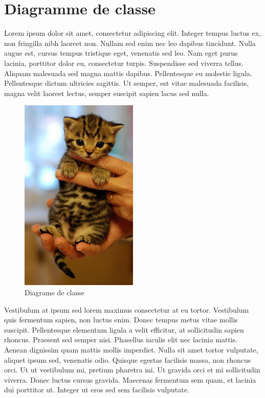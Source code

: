 \section{Diagramme de classe}

Lorem ipsum dolor sit amet, consectetur adipiscing elit. Integer tempus luctus ex, non fringilla nibh laoreet non. Nullam sed enim nec leo dapibus tincidunt. Nulla augue est, cursus tempus tristique eget, venenatis sed leo. Nam eget purus lacinia, porttitor dolor eu, consectetur turpis. Suspendisse sed viverra tellus. Aliquam malesuada sed magna mattis dapibus. Pellentesque eu molestie ligula. Pellentesque dictum ultricies sagittis. Ut semper, est vitae malesuada facilisis, magna velit laoreet lectus, semper suscipit sapien lacus sed nulla.
	\begin{figure}
		\begin{center}
			\includegraphics[width=0.5\textwidth]{figure/diagramme_de_classe.png}
		\end{center}
		\caption{Diagrame de classe}
		\label{fig:planif}
	\end{figure}

Vestibulum at ipsum sed lorem maximus consectetur at eu tortor. Vestibulum quis fermentum sapien, non luctus enim. Donec tempus metus vitae mollis suscipit. Pellentesque elementum ligula a velit efficitur, at sollicitudin sapien rhoncus. Praesent sed semper nisi. Phasellus iaculis elit nec lacinia mattis. Aenean dignissim quam mattis mollis imperdiet. Nulla sit amet tortor vulputate, aliquet ipsum sed, venenatis odio. Quisque egestas facilisis massa, non rhoncus orci. Ut ut vestibulum mi, pretium pharetra mi. Ut gravida orci et mi sollicitudin viverra. Donec luctus cursus gravida. Maecenas fermentum sem quam, et lacinia dui porttitor ut. Integer ut eros sed sem facilisis vulputate.


